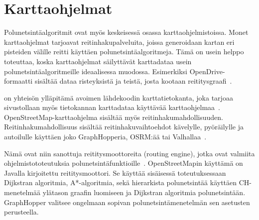 \section{Karttaohjelmat}\label{karttaohjelmat}
Polunetsintäalgoritmit ovat myös keskeisessä osassa karttaohjelmistoissa. 
Monet karttaohjelmat tarjoavat reitinhakupalveluita, joissa generoidaan kartan  
eri pisteiden välille reitti käyttäen polunetsintäalgoritmeja. Tämä on usein 
helppo toteuttaa, koska karttaohjelmat säilyttävät karttadataa usein 
polunetsintäalgoritmeille ideaalisessa muodossa. Esimerkiksi OpenDrive-
formaatti sisältää dataa risteyksistä ja teistä, josta kootaan 
reititysgraafi~\cite{Lanelet2}. \par
	\textcite{OpenStreetMap} on yhteisön ylläpitämä avoimen lähdekoodin 
karttatietokanta, joka tarjoaa sivustollaan myös tietokannan karttadataa 
käyttävää karttaohjelmaa~\cite{OSMAbout}. OpenStreetMap-karttaohjelma sisältää 
myös reitinhakumahdolli\-suu\-den. Reitinhakumahdollisuus sisältää 
reitinhakuvaihtoehdot kävelylle, pyöräilylle ja autoilulle käyttäen joko 
GraphHopperia, OSRM:ää tai Valhallaa~\cite{OpenStreetMap}. \par
	Nämä ovat niin sanottuja reititysmoottoreita (routing engine), jotka 
ovat val\-mii\-ta ohjelmistototeutuksia 
polunetsintäfunktioille~\cite{graphhopper}. OpenStreetMapin käyttämä 
\textcite{graphhopper} on Javalla kirjoitettu reititysmoottori. Se käyttää 
si\-säi\-ses\-sä toteutuksessaan Dijkstran algoritmia, A*-algoritmia, sekä 
hierarkista po\-lun\-etsintää käyttäen CH-menetelmää ylätason graafin 
luomiseen ja Dijkstran algoritmia polunetsintään. GraphHopper valitsee 
ongelmaan sopivan polunetsintämenetelmän sen asetusten perusteella.

